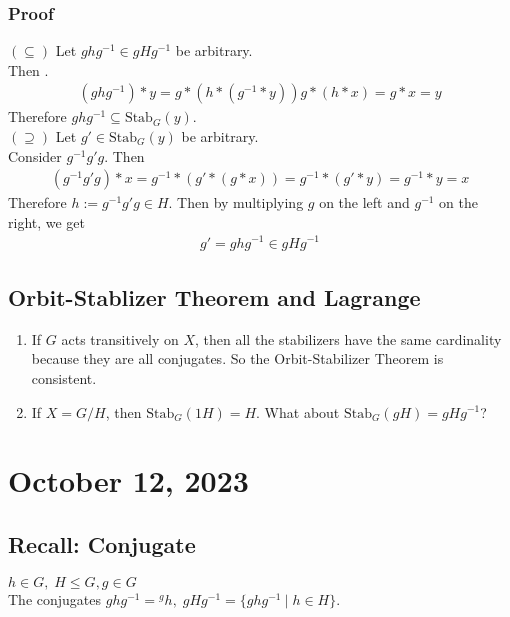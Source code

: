 \documentclass[11pt]{article}
\newcommand{\0}{\emptyset}
\begin{document}
\subsubsection*{Proof}
\label{sec:orge466097}
\((\subseteq)\) Let \(ghg^{-1}\in gHg^{-1}\) be arbitrary.\\[0pt]
Then .\\[0pt]
\begin{align*}
  (ghg^{-1})*y
  =g*(h*(g^{-1}*y))g*(h*x)
  =g*x
  =y
\end{align*}
Therefore \(ghg^{-1}\subseteq\text{Stab}_{G}(y)\).\\[0pt]
\((\supseteq)\) Let \(g'\in\text{Stab}_{G}(y)\) be arbitrary.\\[0pt]
Consider \(g^{-1}g'g\). Then\\[0pt]
\begin{align*}
  (g^{-1}g'g)*x
  =g^{-1}*(g'*(g*x))
  =g^{-1}*(g'*y)
  =g^{-1}*y
  =x
\end{align*}
Therefore \(h:=g^{-1}g'g\in H\). Then by multiplying \(g\) on the left and \(g^{-1}\) on the right, we get\\[0pt]
\begin{align*}
  g'=ghg^{-1}\in gHg^{-1}
\end{align*}
\subsection*{Orbit-Stablizer Theorem and Lagrange}
\label{sec:org232a1dd}
\begin{enumerate}
\item If \(G\) acts transitively on \(X\), then all the stabilizers have the same cardinality because they are all conjugates. So the Orbit-Stabilizer Theorem is consistent.\\[0pt]
\item If \(X=G/H\), then \(\text{Stab}_{G}(1H)=H\). What about \(\text{Stab}_{G}(gH)=gHg^{-1}\)?\\[0pt]
\end{enumerate}
\section*{October 12, 2023}
\label{sec:orgc6f5855}
\subsection*{Recall: Conjugate}
\label{sec:org31d2a5f}
\(h\in G,\;H\leq G,g\in G\)\\[0pt]
The conjugates \(ghg^{-1}={}^{g}h,\;gHg^{-1}=\{ghg^{-1}\:|\;h\in H\}\).\\[0pt]
\end{document}
